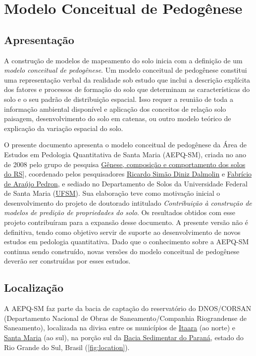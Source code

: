 \artigotrue
\chapter{Modelo Conceitual de Pedogênese}
\label{chap:pedogenesis}

\section{Apresentação}

A construção de modelos de mapeamento do solo inicia com a definição de um \textit{modelo conceitual
de pedogênese}. Um modelo conceitual de pedogênese constitui uma representação verbal da realidade 
sob estudo que inclui a descrição explícita dos fatores e processos de formação do solo que 
determinam as características do solo e o seu padrão de distribuição espacial. Isso requer a reunião
de toda a informação ambiental disponível e aplicação dos conceitos de relação solo paisagem, 
desenvolvimento do solo em catenas, ou outro modelo teórico de explicação da variação espacial do 
solo.

O presente documento apresenta o modelo conceitual de pedogênese da Área de Estudos em Pedologia 
Quantitativa de Santa Maria (AEPQ-SM), criada no ano de 2008 pelo grupo de pesquisa 
\href{dgp.cnpq.br/dgp/espelhogrupo/9373361709890764}{Gênese, composição e comportamento dos solos do
RS}], coordenado pelos pesquisadores \href{http://lattes.cnpq.br/3735884911693854}{Ricardo Simão 
Diniz Dalmolin} e \href{http://lattes.cnpq.br/6868334304493274}{Fabrício de Araújo Pedron}, e 
sediado no Departamento de Solos da Universidade Federal de Santa Maria 
(\href{http://site.ufsm.br/}{UFSM}). Sua elaboração teve como motivação inicial o desenvolvimento do
projeto de doutorado intitulado \textit{Contribuição à construção de modelos de predição de 
propriedades do solo}. Os resultados obtidos com esse projeto contribuíram para a expansão desse 
documento. A presente versão não é definitiva, tendo como objetivo servir de suporte ao 
desenvolvimento de novos estudos em pedologia quantitativa. Dado que o conhecimento sobre a AEPQ-SM 
continua sendo construído, novas versões do modelo conceitual de pedogênese deverão ser construídas 
por esses estudos.

\section{Localização}

A AEPQ-SM faz parte da bacia de captação do reservatório do DNOS/CORSAN (Departamento Nacional de 
Obras de Saneamento/Companhia Riograndense de Saneamento), localizada na divisa entre os municípios 
de \href{http://pt.wikipedia.org/wiki/Itaara}{Itaara} (ao norte) e 
\href{http://pt.wikipedia.org/wiki/Santa_Maria_\%28Rio_Grande_do_Sul\%29}{Santa Maria} (ao sul), na 
porção sul da \href{http://pt.wikipedia.org/wiki/Bacia_do_Paran\%C3\%A1}{Bacia Sedimentar do Paraná},
estado do Rio Grande do Sul, Brasil (\autoref{fig:location}).

